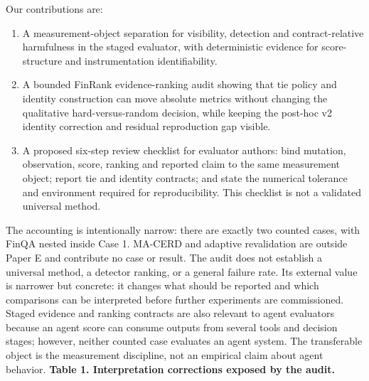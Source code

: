 \documentclass[10pt,conference]{IEEEtran}
\begin{document}
Our contributions are:
\begin{enumerate}
\item A measurement-object separation for visibility, detection and contract-relative harmfulness in the staged evaluator, with deterministic evidence for score-structure and instrumentation identifiability.
\item A bounded FinRank evidence-ranking audit showing that tie policy and identity construction can move absolute metrics without changing the qualitative hard-versus-random decision, while keeping the post-hoc v2 identity correction and residual reproduction gap visible.
\item A proposed six-step review checklist for evaluator authors: bind mutation, observation, score, ranking and reported claim to the same measurement object; report tie and identity contracts; and state the numerical tolerance and environment required for reproducibility. This checklist is not a validated universal method.
\end{enumerate}
The accounting is intentionally narrow: there are exactly two counted cases, with FinQA nested inside Case 1. MA-CERD and adaptive revalidation are outside Paper E and contribute no case or result. The audit does not establish a universal method, a detector ranking, or a general failure rate. Its external value is narrower but concrete: it changes what should be reported and which comparisons can be interpreted before further experiments are commissioned.
Staged evidence and ranking contracts are also relevant to agent evaluators because an agent score can consume outputs from several tools and decision stages; however, neither counted case evaluates an agent system. The transferable object is the measurement discipline, not an empirical claim about agent behavior.
\textbf{Table 1. Interpretation corrections exposed by the audit.}
\end{document}
